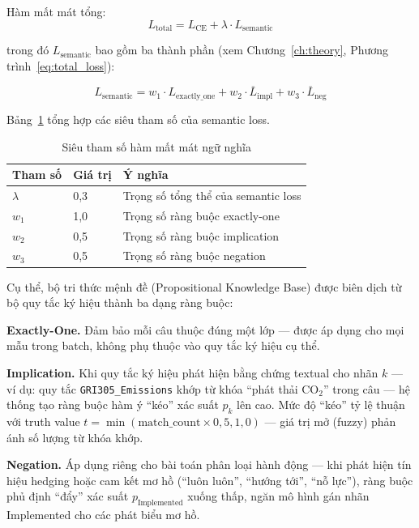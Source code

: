 Hàm mất mát tổng:
\begin{equation}
    L_{\text{total}} = L_{\text{CE}} + \lambda \cdot L_{\text{semantic}}
\end{equation}

\noindent trong đó $L_{\text{semantic}}$ bao gồm ba thành phần (xem Chương~\ref{ch:theory}, Phương trình~\ref{eq:total_loss}):

\begin{equation}
    L_{\text{semantic}} = w_1 \cdot L_{\text{exactly\_one}} + w_2 \cdot \overline{L}_{\text{impl}} + w_3 \cdot \overline{L}_{\text{neg}}
\end{equation}

Bảng~\ref{tab:semantic_loss_params} tổng hợp các siêu tham số của semantic loss.

\begin{table}[htbp]
\centering
\caption{Siêu tham số hàm mất mát ngữ nghĩa}
\label{tab:semantic_loss_params}
\small
\renewcommand{\arraystretch}{1.2}
\begin{tabular}{|l|l|p{6.5cm}|}
\hline
\textbf{Tham số} & \textbf{Giá trị} & \textbf{Ý nghĩa} \\
\hline
$\lambda$ & 0{,}3 & Trọng số tổng thể của semantic loss \\
\hline
$w_1$ & 1{,}0 & Trọng số ràng buộc exactly-one \\
\hline
$w_2$ & 0{,}5 & Trọng số ràng buộc implication \\
\hline
$w_3$ & 0{,}5 & Trọng số ràng buộc negation \\
\hline
\end{tabular}
\end{table}

Cụ thể, bộ tri thức mệnh đề (Propositional Knowledge Base) được biên dịch từ bộ quy tắc ký hiệu thành ba dạng ràng buộc:

\textbf{Exactly-One.} Đảm bảo mỗi câu thuộc đúng một lớp --- được áp dụng cho mọi mẫu trong batch, không phụ thuộc vào quy tắc ký hiệu cụ thể.

\textbf{Implication.} Khi quy tắc ký hiệu phát hiện bằng chứng textual cho nhãn $k$ --- ví dụ: quy tắc \texttt{GRI305\_Emissions} khớp từ khóa ``phát thải CO$_2$'' trong câu --- hệ thống tạo ràng buộc hàm ý ``kéo'' xác suất $p_k$ lên cao. Mức độ ``kéo'' tỷ lệ thuận với truth value $t = \min(\text{match\_count} \times 0{,}5, 1{,}0)$ --- giá trị mở (fuzzy) phản ánh số lượng từ khóa khớp.

\textbf{Negation.} Áp dụng riêng cho bài toán phân loại hành động --- khi phát hiện tín hiệu hedging hoặc cam kết mơ hồ (``luôn luôn'', ``hướng tới'', ``nỗ lực''), ràng buộc phủ định ``đẩy'' xác suất $p_{\text{Implemented}}$ xuống thấp, ngăn mô hình gán nhãn Implemented cho các phát biểu mơ hồ.

